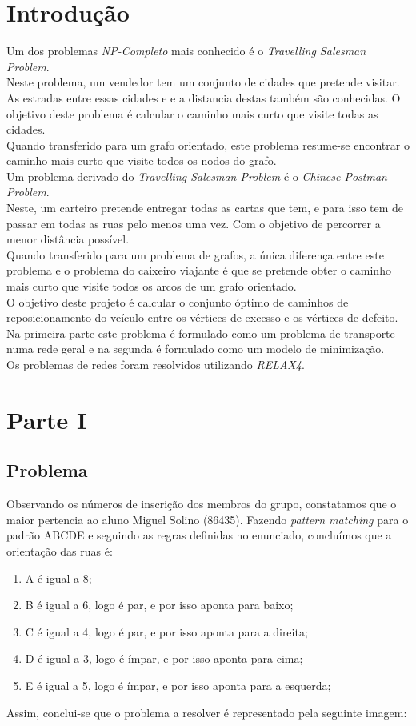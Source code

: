 \documentclass[a4paper]{report}
\begin{document}
\chapter{Introdução}
Um dos problemas \textit{NP-Completo} mais conhecido é o \textit{Travelling
Salesman Problem}. \\
Neste problema, um vendedor tem um conjunto de cidades que pretende visitar. As
estradas entre essas cidades e e a distancia destas também são conhecidas. O
objetivo deste problema é calcular o caminho mais curto que visite todas as
cidades.\\
Quando transferido para um grafo orientado, este problema resume-se
encontrar o caminho mais curto que visite todos os nodos do grafo.\\
Um problema derivado do \textit{Travelling Salesman Problem} é o \textit{Chinese
Postman Problem}.\\
Neste, um carteiro pretende entregar todas as cartas que tem, e para isso tem de
passar em todas as ruas pelo menos uma vez. Com o objetivo de percorrer a menor
distância possível.\\
Quando transferido para um problema de grafos, a única diferença entre este
problema e o problema do caixeiro viajante é que se pretende obter o caminho
mais curto que visite todos os arcos de um grafo orientado. \\
O objetivo deste projeto é calcular o conjunto óptimo de caminhos de reposicionamento
do veículo entre os vértices de excesso e os vértices de defeito. Na primeira
parte este problema é formulado como um problema de transporte numa rede geral e
na segunda é formulado como um modelo de minimização.\\
Os problemas de redes foram resolvidos utilizando \textit{RELAX4}.

\chapter{Parte I}
\section{Problema}
Observando os números de inscrição dos membros do grupo, constatamos
que o maior pertencia ao aluno Miguel Solino (86435).
Fazendo \textit{pattern matching} para o padrão ABCDE e seguindo as
regras definidas no enunciado, concluímos que a orientação das ruas é:

\begin{enumerate}
    \item A é igual a 8;
    \item B é igual a 6, logo é par, e por isso aponta para baixo;
    \item C é igual a 4, logo é par, e por isso aponta para a direita;
    \item D é igual a 3, logo é ímpar, e por isso aponta para cima;
    \item E é igual a 5, logo é ímpar, e por isso aponta para a 
        esquerda;
\end{enumerate}
Assim, conclui-se que o problema a resolver é representado pela
seguinte imagem:
\end{document}
